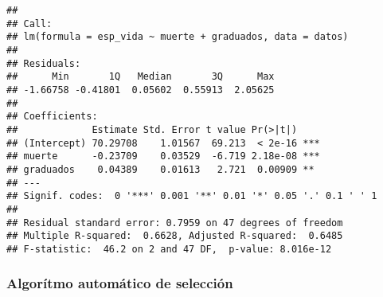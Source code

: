 \documentclass[]{article}
\newenvironment{Shaded}{\begin{snugshade}}{\end{snugshade}}
\newcommand{\KeywordTok}[1]{\textcolor[rgb]{0.13,0.29,0.53}{\textbf{#1}}}
\newcommand{\DataTypeTok}[1]{\textcolor[rgb]{0.13,0.29,0.53}{#1}}
\newcommand{\DecValTok}[1]{\textcolor[rgb]{0.00,0.00,0.81}{#1}}
\newcommand{\FloatTok}[1]{\textcolor[rgb]{0.00,0.00,0.81}{#1}}
\newcommand{\StringTok}[1]{\textcolor[rgb]{0.31,0.60,0.02}{#1}}
\newcommand{\CommentTok}[1]{\textcolor[rgb]{0.56,0.35,0.01}{\textit{#1}}}
\newcommand{\OperatorTok}[1]{\textcolor[rgb]{0.81,0.36,0.00}{\textbf{#1}}}
\newcommand{\NormalTok}[1]{#1}
\begin{document}
\begin{verbatim}
## 
## Call:
## lm(formula = esp_vida ~ muerte + graduados, data = datos)
## 
## Residuals:
##      Min       1Q   Median       3Q      Max 
## -1.66758 -0.41801  0.05602  0.55913  2.05625 
## 
## Coefficients:
##             Estimate Std. Error t value Pr(>|t|)    
## (Intercept) 70.29708    1.01567  69.213  < 2e-16 ***
## muerte      -0.23709    0.03529  -6.719 2.18e-08 ***
## graduados    0.04389    0.01613   2.721  0.00909 ** 
## ---
## Signif. codes:  0 '***' 0.001 '**' 0.01 '*' 0.05 '.' 0.1 ' ' 1
## 
## Residual standard error: 0.7959 on 47 degrees of freedom
## Multiple R-squared:  0.6628, Adjusted R-squared:  0.6485 
## F-statistic:  46.2 on 2 and 47 DF,  p-value: 8.016e-12
\end{verbatim}

\begin{Shaded}
\end{Shaded}

\subsubsection{Algorítmo automático de
selección}\label{algoruxedtmo-automuxe1tico-de-selecciuxf3n}
\end{document}
